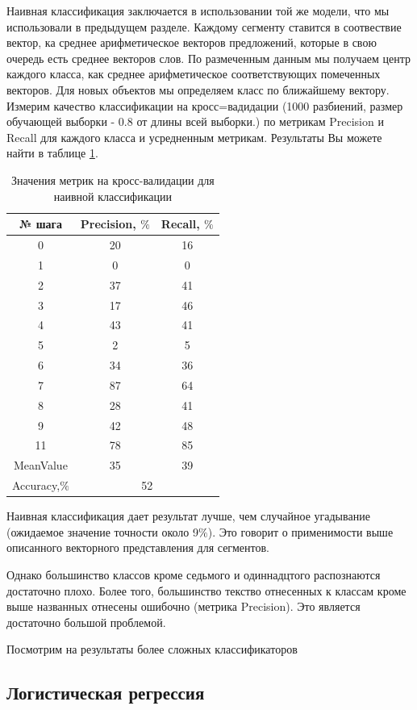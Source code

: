 \documentclass[12pt]{article}
\begin{document}
Наивная классификация заключается в использовании той же модели, что мы использовали в предыдущем разделе. Каждому сегменту ставится в соотвествие вектор, ка среднее арифметическое векторов предложений, которые в свою очередь есть среднее векторов слов. По размеченным данным мы получаем центр каждого класса, как среднее арифметическое соответствующих помеченных векторов. Для новых объектов мы определяем класс по ближайшему вектору. Измерим качество классификации на кросс=вадидации (1000 разбиений, размер обучающей выборки - 0.8 от длины всей выборки.) по метрикам Precision и Recall для каждого класса и усредненным метрикам. Результаты Вы можете найти в таблице \ref{table:naive}.

\begin{table}[h!]
\centering
\begin{tabular}{||c|c|c||}
\hline
№ шага &  Precision, $\%$ &Recall, $\%$ \\
\hline
0 &	20 &	16 \\
\hline
1 &	0 &	0 \\
\hline
2&	37 &	41 \\
\hline
3 &	17 &	46 \\
\hline
4 &	43 &	41 \\
\hline
5 &	2 &	5 \\
\hline
6 &	34 &	36 \\
\hline
7 &	87 &	64 \\
\hline
8 &	28 &	41 \\
\hline
9 &	42 &	48 \\
\hline
11 &	78 &	85 \\
\hline
MeanValue&35&39\\
\hline
Accuracy,$\%$&  \multicolumn{2}{c|}{52}\\
\hline
\end{tabular}
\caption{Значения метрик на кросс-валидации для наивной классификации}
\label{table:naive}
\end{table}

Наивная классификация дает результат лучше, чем случайное угадывание (ожидаемое значение точности около 9$\%$). Это говорит о применимости выше описанного векторного представления для сегментов.

Однако большинство классов кроме седьмого и одиннадцтого распознаются достаточно плохо. Более того, большинство текство отнесенных к классам кроме выше названных отнесены ошибочно (метрика Precision). Это является достаточно большой проблемой.

Посмотрим на результаты более сложных классификаторов

\subsection{Логистическая регрессия}
\end{document}
